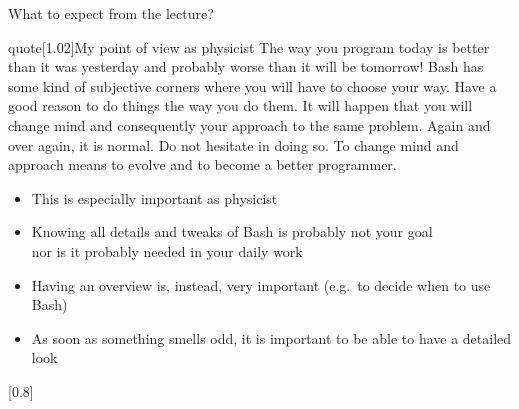 \begin{frame}{What to expect from the lecture?}
    \vspace{-3mm}
    \begin{varblock}{quote}[1.02\textwidth]{My point of view as physicist}
        The way you program today is better than it was yesterday and probably worse than it will be tomorrow!
        Bash has some kind of subjective corners where you will have to choose your way.
        Have a good reason to do things the way you do them.
        It will happen that you will change mind and consequently your approach to the same problem.
        Again and over again, it is normal.
        Do not hesitate in doing so.
        To change mind and approach means to evolve and to become a better programmer.
    \end{varblock}
    \begin{itemize}
        \item This is especially important as physicist
        \item Knowing all details and tweaks of Bash is probably not your goal \\
              \then nor is it probably needed in your daily work
        \item \alert{Having an overview} is, instead, very important (e.g.\ to \alert{decide when to use Bash})
        \item As soon as something smells odd, it is important \alert{to be able to have a detailed look}
    \end{itemize}
    \begin{varblock}{}[0.8\textwidth]{}%
    \end{varblock}

\end{frame}
